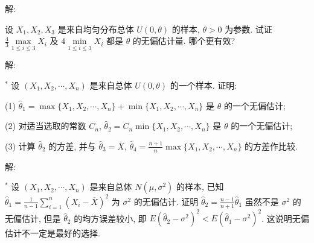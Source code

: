 \documentclass[standard]{ExBook}
\begin{document}
\begin{qitems}
\vspace{-5em}

    \begin{bbox}
解: 
    \end{bbox}

\vspace{-5em}

    \begin{bbox}
    \begin{shaded}
        \qitem
设 \(X_1, X_2, X_3\) 是来自均匀分布总体 \(U(0, \theta)\) 的样本, \(\theta > 0\) 为参数. 试证 \(\displaystyle\frac{4}{3} \max\limits_{1 \leq i \leq 3} X_i\) 及 \(4 \min\limits_{1 \leq i \leq 3} X_i\) 都是 \(\theta\) 的无偏估计量. 哪个更有效?
    \end{shaded}
    \end{bbox}

\vspace{-5em}

    \begin{bbox}
解: 
    \end{bbox}

\vspace{-5em}

    \begin{bbox}
    \begin{shaded}
        \qitem$^*$
设 \((X_1, X_2, \cdots, X_n)\) 是来自总体 \(U(0, \theta)\) 的一个样本. 证明:

(1) \(\hat{\theta}_1 = \max\{X_1, X_2, \cdots, X_n\} + \min\{X_1, X_2, \cdots, X_n\}\) 是 \(\theta\) 的一个无偏估计;

(2) 对适当选取的常数 \(C_n\), \(\hat{\theta}_2 = C_n \min\{X_1, X_2, \cdots, X_n\}\) 是 \(\theta\) 的一个无偏估计;

(3) 计算 \(\hat{\theta}_2\) 的方差, 并与 \(\hat{\theta}_3 = \overline{X}\), \(\hat{\theta}_4 = \displaystyle\frac{n+1}{n} \max\{X_1, X_2, \cdots, X_n\}\) 的方差作比较.
    \end{shaded}
    \end{bbox}

\vspace{-5em}

    \begin{bbox}
解: 
    \end{bbox}

\vspace{-5em}

    \begin{bbox}
    \begin{shaded}
        \qitem$^*$
设 \((X_1, X_2, \cdots, X_n)\) 是来自总体 \(N(\mu, \sigma^2)\) 的样本, 已知 \(\hat{\theta}_1 = \displaystyle\frac{1}{n-1} \sum\limits_{i=1}^n (X_i - \overline{X})^2\) 为 \(\sigma^2\) 的无偏估计. 证明 \(\hat{\theta}_2 = \displaystyle\frac{n-1}{n+1} \hat{\theta}_1\) 虽然不是 \(\sigma^2\) 的无偏估计, 但是 \(\hat{\theta}_2\) 的均方误差较小, 即 \(E(\hat{\theta}_2 - \sigma^2)^2 < E(\hat{\theta}_1 - \sigma^2)^2\). 这说明无偏估计不一定是最好的选择.
    \end{shaded}
    \end{bbox}


\end{qitems}
\end{document}
